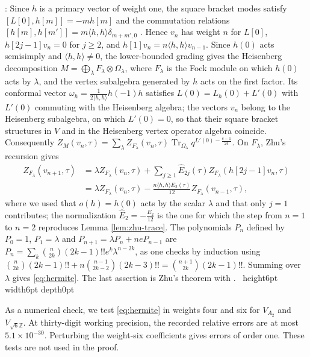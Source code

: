 \documentclass[leqno]{article}
\newcommand{\Z}{\ensuremath{\mathbb{Z}}}
\renewcommand{\geq}{\ensuremath{\geqslant}}
\newcommand{\qed}{\hfill \vrule height6pt  width6pt depth0pt}
\newcommand{\ot}{\otimes}
\newenvironment{proof}[1][]{\noindent {\it Proof #1} : }{\hbox{~}\qed
\smallskip
}
\numberwithin{equation}{section}
\begin{document}
\begin{proof}
Since $h$ is a primary vector of weight one, the square bracket modes satisfy $[L[0],h[m]] = -mh[m]$ and the commutation relations $[h[m],h[m']] = m\langle h,h\rangle\delta_{m+m',0}$ \cite[Section 4]{Zhu96}. Hence $v_n$ has weight $n$ for $L[0]$, $h[2j-1]v_n = 0$ for $j \geq 2$, and $h[1]v_n = n\langle h,h\rangle v_{n-1}$. Since $h(0)$ acts semisimply and $\langle h,h\rangle \neq 0$, the lower-bounded grading gives the Heisenberg decomposition $M = \bigoplus_\lambda F_\lambda \ot \Omega_\lambda$, where $F_\lambda$ is the Fock module on which $h(0)$ acts by $\lambda$, and the vertex subalgebra generated by $h$ acts on the first factor. Its conformal vector $\omega_h = \frac{1}{2\langle h,h\rangle}h(-1)h$ satisfies $L(0) = L_h(0)+L'(0)$ with $L'(0)$ commuting with the Heisenberg algebra; the vectors $v_n$ belong to the Heisenberg subalgebra, on which $L'(0) = 0$, so that their square bracket structures in $V$ and in the Heisenberg vertex operator algebra coincide. Consequently $Z_M(v_n,\tau) = \sum_\lambda Z_{F_\lambda}(v_n,\tau)\operatorname{Tr}_{\Omega_\lambda}q^{L'(0)-\frac{c-1}{24}}$. On $F_\lambda$, Zhu's recursion \cite[Proposition 4.3.5]{Zhu96} gives
\begin{align*}
Z_{F_\lambda}(v_{n+1},\tau)
&= \lambda Z_{F_\lambda}(v_n,\tau)+\sum_{j \geq 1}\widehat E_{2j}(\tau)Z_{F_\lambda}(h[2j-1]v_n,\tau) \\
&= \lambda Z_{F_\lambda}(v_n,\tau)-\frac{n\langle h,h\rangle E_2(\tau)}{12}Z_{F_\lambda}(v_{n-1},\tau),
\end{align*}
where we used that $o(h) = h(0)$ acts by the scalar $\lambda$ and that only $j = 1$ contributes; the normalization $\widehat E_2 = -\frac{E_2}{12}$ is the one for which the step from $n = 1$ to $n = 2$ reproduces Lemma \ref{lem:zhu-trace}. The polynomials $P_n$ defined by $P_0 = 1$, $P_1 = \lambda$ and $P_{n+1} = \lambda P_n+ne P_{n-1}$ are $P_n = \sum_k\binom{n}{2k}(2k-1)!!e^k\lambda^{n-2k}$, as one checks by induction using $\binom{n}{2k}(2k-1)!!+n\binom{n-1}{2k-2}(2k-3)!! = \binom{n+1}{2k}(2k-1)!!$. Summing over $\lambda$ gives \eqref{eq:hermite}. The last assertion is Zhu's theorem \cite{Zhu96} with \cite{Hua08}.
\end{proof}

As a numerical check, we test \eqref{eq:hermite} in weights four and six for $V_{A_2}$ and $V_{\sqrt6\Z}$. At thirty-digit working precision, the recorded relative errors are at most $5.1\times10^{-30}$. Perturbing the weight-six coefficients gives errors of order one. These tests are not used in the proof.
\end{document}

